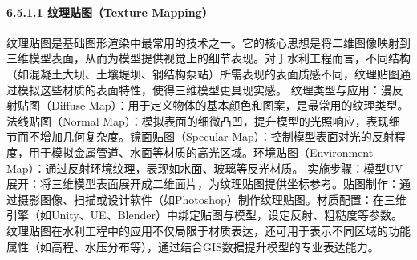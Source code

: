 {\paragraph{6.5.1.1 纹理贴图（Texture Mapping）}\label{ux7eb9ux7406ux8d34ux56fetexture-mapping}
纹理贴图是基础图形渲染中最常用的技术之一。它的核心思想是将二维图像映射到三维模型表面，从而为模型提供视觉上的细节表现。对于水利工程而言，不同结构（如混凝土大坝、土壤堤坝、钢结构泵站）所需表现的表面质感不同，纹理贴图通过模拟这些材质的表面特性，使得三维模型更具现实感。
纹理类型与应用：漫反射贴图（Diffuse Map）：用于定义物体的基本颜色和图案，是最常用的纹理类型。法线贴图（Normal Map）：模拟表面的细微凸凹，提升模型的光照响应，表现细节而不增加几何复杂度。镜面贴图（Specular
Map）：控制模型表面对光的反射程度，用于模拟金属管道、水面等材质的高光区域。环境贴图（Environment Map）：通过反射环境纹理，表现如水面、玻璃等反光材质。
实施步骤：模型UV展开：将三维模型表面展开成二维面片，为纹理贴图提供坐标参考。贴图制作：通过摄影图像、扫描或设计软件（如Photoshop）制作纹理贴图。材质配置：在三维引擎（如Unity、UE、Blender）中绑定贴图与模型，设定反射、粗糙度等参数。纹理贴图在水利工程中的应用不仅局限于材质表达，还可用于表示不同区域的功能属性（如高程、水压分布等），通过结合GIS数据提升模型的专业表达能力。
}
